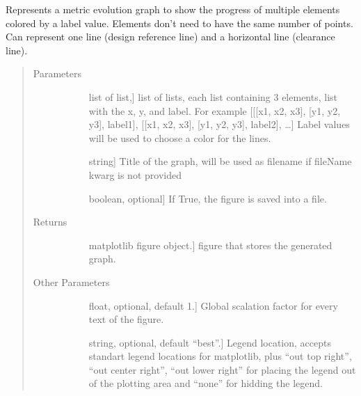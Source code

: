 \documentclass[letterpaper,10pt,english]{sphinxmanual}
\begin{document}
\begin{fulllineitems}
\label{\detokenize{rstFiles/metricsEvolution:metricsEvolution.metricEvolutionGraph}}
Represents a metric evolution graph to show the progress of 
multiple elements colored by a label value. 
Elements don’t need to have the same number of points.
Can represent one line (design reference line) 
and a horizontal line (clearance line).
\begin{quote}\begin{description}
\item[{Parameters}] \leavevmode\begin{description}
\item[{}] \leavevmode{[}list of list,{]}
list of lists, each list containing 3 elements, 
list with the x, y, and label. For example 
{[}{[}{[}x1, x2, x3{]}, {[}y1, y2, y3{]}, label1{]}, 
{[}{[}x1, x2, x3{]}, {[}y1, y2, y3{]}, label2{]}, …{]} 
Label values will be used to choose a color for the lines.

\item[{}] \leavevmode{[}string{]}
Title of the graph, will be used as filename 
if fileName kwarg is not provided

\item[{}] \leavevmode{[}boolean, optional{]}
If True, the figure is saved into a file.

\end{description}

\item[{Returns}] \leavevmode\begin{description}
\item[{}] \leavevmode{[}matplotlib figure object.{]}
figure that stores the generated graph.

\end{description}

\item[{Other Parameters}] \leavevmode\begin{description}
\item[{}] \leavevmode{[}float, optional, default 1.{]}
Global scalation factor for every text of the figure.

\item[{}] \leavevmode{[}string, optional, default “best”.{]}
Legend location, accepts standart legend locations 
for matplotlib, plus “out top right”, “out center right”, 
“out lower right” for placing the legend out of 
the plotting area and “none” for hidding the legend.


\end{description}
\end{description}
\end{quote}
\end{fulllineitems}
\end{document}
